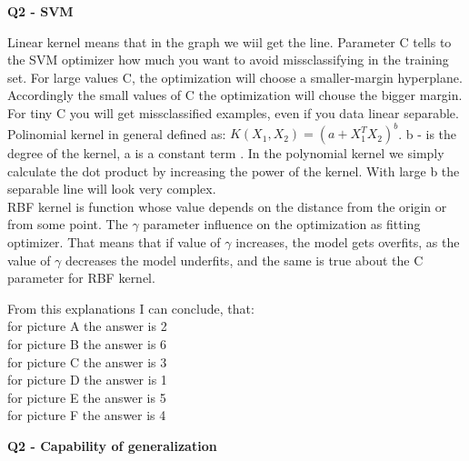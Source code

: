 \documentclass[12pt,a4paper]{article}
\begin{document}
\newpage
\begin{center}
	\textbf{Q2 - SVM}
\end{center}

Linear kernel means that in the graph we wiil get the line. Parameter C tells to the SVM optimizer how much you want to avoid missclassifying in the training set. For large values C, the optimization will choose a smaller-margin hyperplane. Accordingly the small values of C the optimization will chouse the bigger margin. For tiny C you will get missclassified examples, even if you data linear separable.\\
 Polinomial kernel in general defined as: $K(X_1,X_2) = (a+X_1^T X_2)^b$. b - is the degree of the kernel, a is a constant term \cite{svm}. In the polynomial kernel we simply calculate the dot product by increasing the power of the kernel. With large b the separable line will look very complex.\\
RBF kernel is function whose value depends on the distance from the origin or from some point. The $\gamma$ parameter influence on the optimization as fitting optimizer. That means that if value of $\gamma$  increases, the model gets overfits, as the value of $\gamma$  decreases the model underfits, and the same is true about the C parameter for RBF kernel.

From this explanations I can conclude, that:\\
for picture A the answer is 2\\
for picture B the answer is 6\\
for picture C the answer is 3\\
for picture D the answer is 1\\
for picture E the answer is 5\\
for picture F the answer is 4\\
\newpage
\begin{center}
	\textbf{Q2 - Capability of generalization}
\end{center}

\newpage


\end{document}
